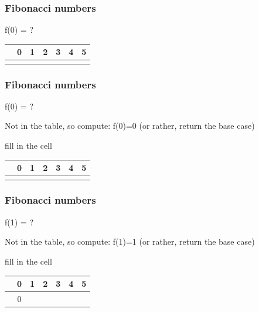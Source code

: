 \documentclass{beamer}
\begin{document}
\begin{frame}
\frametitle{Fibonacci numbers}
f(0) = ?

\vspace{0.5cm}

\begin{tabular}{c|cccccc}
&0&1&2&3&4&5\\
\hline
&&&&&&\\
\end{tabular}
\end{frame}

\begin{frame}
\frametitle{Fibonacci numbers}
f(0) = ?

\vspace{0.5cm}

Not in the table, so compute: f(0)=0 (or rather, return the base case)

\vspace{0.5cm}

fill in the cell

\vspace{0.5cm}

\begin{tabular}{c|cccccc}
&0&1&2&3&4&5\\
\hline
&&&&&&\\
\end{tabular}
\end{frame}

\begin{frame}
\frametitle{Fibonacci numbers}
f(1) = ?

\vspace{0.5cm}

Not in the table, so compute: f(1)=1 (or rather, return the base case)

\vspace{0.5cm}

fill in the cell

\vspace{0.5cm}

\begin{tabular}{c|cccccc}
&0&1&2&3&4&5\\
\hline
&0&&&&&\\
\end{tabular}
\end{frame}
\end{document}
